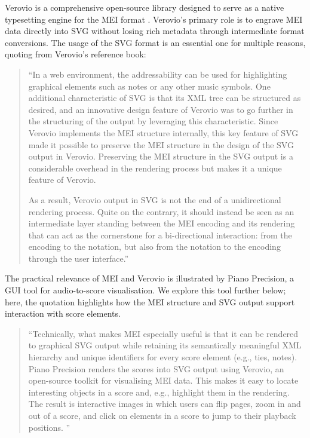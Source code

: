 Verovio is a comprehensive open-source library designed to serve as a native typesetting engine for the MEI format \cite{pugin2014VerovioLibraryEngraving}. Verovio's primary role is to engrave MEI data directly into SVG without losing rich metadata through intermediate format conversions. The usage of the SVG format is an essential one for multiple reasons, quoting from Verovio's reference book:

\begin{quote}
``In a web environment, the addressability can be used for highlighting graphical elements such as notes or any other music symbols. One additional characteristic of SVG is that its XML tree can be structured as desired, and an innovative design feature of Verovio was to go further in the structuring of the output by leveraging this characteristic. Since Verovio implements the MEI structure internally, this key feature of SVG made it possible to preserve the MEI structure in the design of the SVG output in Verovio. Preserving the MEI structure in the SVG output is a considerable overhead in the rendering process but makes it a unique feature of Verovio.

As a result, Verovio output in SVG is not the end of a unidirectional rendering process. Quite on the contrary, it should instead be seen as an intermediate layer standing between the MEI encoding and its rendering that can act as the cornerstone for a bi-directional interaction: from the encoding to the notation, but also from the notation to the encoding through the user interface.''  \cite{repertoireinternationaldessourcesmusicalesVerovioReferenceBook2021}
\end{quote} 

The practical relevance of MEI and Verovio is illustrated by Piano Precision, a GUI tool for audio-to-score visualisation. We explore this tool further below; here, the quotation highlights how the MEI structure and SVG output support interaction with score elements.

\begin{quotation}
``Technically, what makes MEI especially useful is that it can be rendered to graphical SVG output while retaining its semantically meaningful XML hierarchy and unique identifiers for every score element (e.g., ties, notes). Piano Precision renders the scores into SVG output using Verovio, an open-source toolkit for visualising MEI data. This makes it easy to locate interesting objects in a score and, e.g., highlight them in the rendering. The result is interactive images in which users can flip pages, zoom in and out of a score, and click on elements in a score to jump to their playback positions. '' \cite{jiangPIANOPRECISIONADVANCING2025}
\end{quotation}

